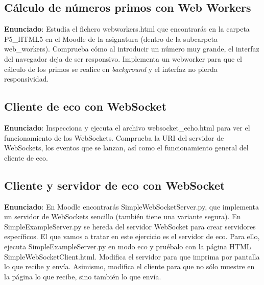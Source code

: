 \subsection{Cálculo de números primos con Web Workers}
\label{subsec:webworker-primos}

\textbf{Enunciado}: Estudia el fichero webworkers.html que encontrarás en la carpeta P5\_HTML5 en el Moodle de la asignatura (dentro de la subcarpeta web\_workers). Comprueba cómo al introducir un número muy grande, el interfaz del navegador deja de ser responsivo. Implementa un webworker para que el cálculo de los primos se realice en \emph{background} y el interfaz no pierda responsividad.

\subsection{Cliente de eco con WebSocket}
\label{subsec:websocket-cliente-eco}

\textbf{Enunciado}: Inspecciona y ejecuta el archivo websocket\_echo.html para ver el funcionamiento de los WebSockets. Comprueba la URI del servidor de WebSockets, los eventos que se lanzan, así como el funcionamiento general del cliente de eco.


\subsection{Cliente y servidor de eco con WebSocket}
\label{subsec:websocket-cliente-servidor-eco}

\textbf{Enunciado}: En Moodle encontrarás SimpleWebSocketServer.py, que implementa un servidor de WebSockets sencillo (también tiene una variante segura). En SimpleExampleServer.py se hereda del servidor WebSocket para crear servidores específicos. El que vamos a tratar en este ejercicio es el servidor de eco. Para ello, ejecuta SimpleExampleServer.py en modo eco y pruébalo con la página HTML SimpleWebSocketClient.html. Modifica el servidor para que imprima por pantalla lo que recibe y envía. Asimismo, modifica el cliente para que no sólo muestre en la página lo que recibe, sino también lo que envía.


